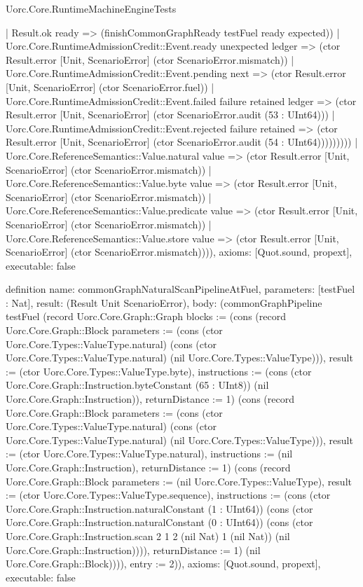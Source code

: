 \begin{lexlean}{Uorc.Core.RuntimeMachineEngineTests}
\begin{semanticmodule}
{                    | Result.ok ready => (finishCommonGraphReady testFuel ready expected))
                  | Uorc.Core.RuntimeAdmissionCredit::Event.ready unexpected ledger => (ctor Result.error [Unit, ScenarioError] (ctor ScenarioError.mismatch))
                  | Uorc.Core.RuntimeAdmissionCredit::Event.pending next => (ctor Result.error [Unit, ScenarioError] (ctor ScenarioError.fuel))
                  | Uorc.Core.RuntimeAdmissionCredit::Event.failed failure retained ledger => (ctor Result.error [Unit, ScenarioError] (ctor ScenarioError.audit (53 : UInt64)))
                  | Uorc.Core.RuntimeAdmissionCredit::Event.rejected failure retained => (ctor Result.error [Unit, ScenarioError] (ctor ScenarioError.audit (54 : UInt64)))))))))
      | Uorc.Core.ReferenceSemantics::Value.natural value => (ctor Result.error [Unit, ScenarioError] (ctor ScenarioError.mismatch))
      | Uorc.Core.ReferenceSemantics::Value.byte value => (ctor Result.error [Unit, ScenarioError] (ctor ScenarioError.mismatch))
      | Uorc.Core.ReferenceSemantics::Value.predicate value => (ctor Result.error [Unit, ScenarioError] (ctor ScenarioError.mismatch))
      | Uorc.Core.ReferenceSemantics::Value.store value => (ctor Result.error [Unit, ScenarioError] (ctor ScenarioError.mismatch)))),
  axioms: [Quot.sound, propext],
  executable: false
}

definition{
  name: commonGraphNaturalScanPipelineAtFuel,
  parameters: [testFuel : Nat],
  result: (Result Unit ScenarioError),
  body: (commonGraphPipeline testFuel (record Uorc.Core.Graph::Graph {blocks := (cons (record Uorc.Core.Graph::Block {parameters := (cons (ctor Uorc.Core.Types::ValueType.natural) (cons (ctor Uorc.Core.Types::ValueType.natural) (nil Uorc.Core.Types::ValueType))), result := (ctor Uorc.Core.Types::ValueType.byte), instructions := (cons (ctor Uorc.Core.Graph::Instruction.byteConstant (65 : UInt8)) (nil Uorc.Core.Graph::Instruction)), returnDistance := 1}) (cons (record Uorc.Core.Graph::Block {parameters := (cons (ctor Uorc.Core.Types::ValueType.natural) (cons (ctor Uorc.Core.Types::ValueType.natural) (nil Uorc.Core.Types::ValueType))), result := (ctor Uorc.Core.Types::ValueType.natural), instructions := (nil Uorc.Core.Graph::Instruction), returnDistance := 1}) (cons (record Uorc.Core.Graph::Block {parameters := (nil Uorc.Core.Types::ValueType), result := (ctor Uorc.Core.Types::ValueType.sequence), instructions := (cons (ctor Uorc.Core.Graph::Instruction.naturalConstant (1 : UInt64)) (cons (ctor Uorc.Core.Graph::Instruction.naturalConstant (0 : UInt64)) (cons (ctor Uorc.Core.Graph::Instruction.scan 2 1 2 (nil Nat) 1 (nil Nat)) (nil Uorc.Core.Graph::Instruction)))), returnDistance := 1}) (nil Uorc.Core.Graph::Block)))), entry := 2})),
  axioms: [Quot.sound, propext],
  executable: false
}


\end{semanticmodule}
\end{lexlean}
